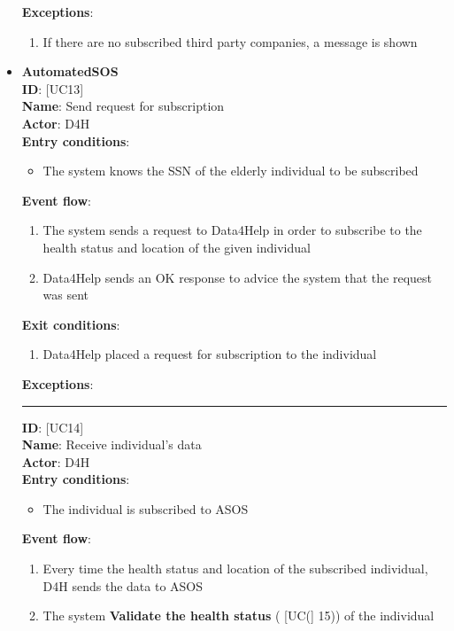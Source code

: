 \documentclass[hidelinks, 12pt]{report}
\newcommand\usecase[1]{ [UC#1] }
\begin{document}
\begin{itemize}
		\textbf{Exceptions}:
  		\begin{enumerate}
			\item{If there are no subscribed third party companies, a message is shown}
		\end{enumerate}
		\item{\textbf{AutomatedSOS}}\\
		\textbf{ID}: \usecase{13} \\
		\textbf{Name}: Send request for subscription \\
		\textbf{Actor}: D4H \\
		\textbf{Entry conditions}:
		\begin{itemize}
			\item{The system knows the SSN of the elderly individual to be subscribed}
		\end{itemize}
		\textbf{Event flow}:
		\begin{enumerate}
			\item{The system sends a request to Data4Help in order to subscribe to the health status and location of the given individual}
			\item{Data4Help sends an OK response to advice the system that the request was sent}
		\end{enumerate}
		\textbf{Exit conditions}:
		\begin{enumerate}
			\item{Data4Help placed a request for subscription to the individual}
		\end{enumerate}
		\textbf{Exceptions}: \\
		\rule{\linewidth}{0.4pt}
		\textbf{ID}: \usecase{14} \\
		\textbf{Name}: Receive individual's data \\
		\textbf{Actor}: D4H \\
		\textbf{Entry conditions}:
		\begin{itemize}
			\item{The individual is subscribed to ASOS}
		\end{itemize}
		\textbf{Event flow}:
		\begin{enumerate}
			\item{Every time the health status and location of the subscribed individual, D4H sends the data to ASOS}
			\item{The system \textbf{Validate the health status} (\usecase(15)) of the individual}
		\end{enumerate}

\end{itemize}
\end{document}
